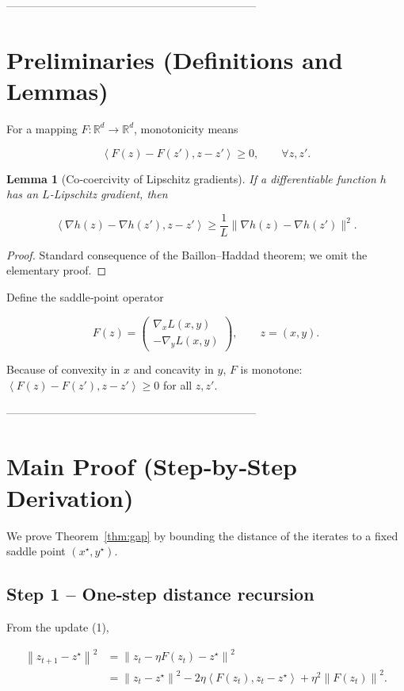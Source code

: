 \documentclass{article}
\newtheorem{lemma}{Lemma}
\newcommand{\norm}[1]{\left\|#1\right\|}
\newcommand{\inner}[2]{\left\langle #1,#2\right\rangle}
\begin{document}
--------------------------------------------------------------------

\section*{Preliminaries (Definitions and Lemmas)}
\begin{definition}
For a mapping \(F:\mathbb{R}^d\to\mathbb{R}^d\), monotonicity means  

\[
\inner{F(z)-F(z')}{z-z'}\ge 0,\qquad\forall z,z'.
\tag{7}
\]
\end{definition}

\begin{lemma}[Co‑coercivity of Lipschitz gradients]\label{lem:coercive}
If a differentiable function \(h\) has an \(L\)-Lipschitz gradient, then  

\[
\inner{\nabla h(z)-\nabla h(z')}{z-z'}\ge\frac{1}{L}\|\nabla h(z)-\nabla h(z')\|^2 .
\tag{8}
\]
\end{lemma}
\begin{proof}
Standard consequence of the Baillon–Haddad theorem; we omit the elementary proof.
\end{proof}

Define the saddle‑point operator  

\[
F(z)=\begin{pmatrix}
\nabla_x L(x,y)\\[2pt]
-\nabla_y L(x,y)
\end{pmatrix},\qquad z=(x,y).
\tag{9}
\]

Because of convexity in \(x\) and concavity in \(y\), \(F\) is monotone:
\(\inner{F(z)-F(z')}{z-z'}\ge 0\) for all \(z,z'\).

--------------------------------------------------------------------

\section*{Main Proof (Step‑by‑Step Derivation)}
We prove Theorem~\ref{thm:gap} by bounding the distance of the iterates to a fixed
saddle point \((x^\star,y^\star)\).

\subsection*{Step 1 – One‑step distance recursion}
From the update (1),

\[
\begin{aligned}
\norm{z_{t+1}-z^\star}^2
&= \norm{z_t -\eta F(z_t)-z^\star}^2\\
&= \norm{z_t-z^\star}^2-2\eta\inner{F(z_t)}{z_t-z^\star}
      +\eta^2\norm{F(z_t)}^2 .
\end{aligned}
\tag{10}
\]
\end{document}
